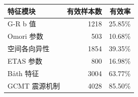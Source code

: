 \begingroup
\footnotesize
\setlength{\tabcolsep}{4pt}
\begin{tabular}{lrr}
\toprule
特征模块 & 有效样本数 & 有效率 \\
\midrule
G-R b 值 & 1218 & 25.85\% \\
Omori 参数 & 503 & 10.68\% \\
空间各向异性 & 1854 & 39.35\% \\
ETAS 参数 & 800 & 16.98\% \\
Båth 特征 & 3004 & 63.77\% \\
GCMT 震源机制 & 4028 & 85.50\% \\
\bottomrule
\end{tabular}
\endgroup
